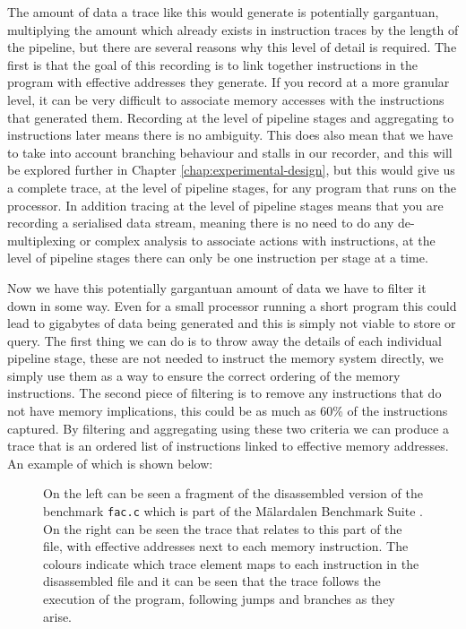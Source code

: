 The amount of data a trace like this would generate is potentially gargantuan, multiplying the amount which already exists in instruction traces by the length of the pipeline, but there are several reasons why this level of detail is required. The first is that the goal of this recording is to link together instructions in the program with effective addresses they generate. If you record at a more granular level, it can be very difficult to associate memory accesses with the instructions that generated them. Recording at the level of pipeline stages and aggregating to instructions later means there is no ambiguity. This does also mean that we have to take into account branching behaviour and stalls in our recorder, and this will be explored further in Chapter \ref{chap:experimental-design}, but this would give us a complete trace, at the level of pipeline stages, for any program that runs on the processor. In addition tracing at the level of pipeline stages means that you are recording a serialised data stream, meaning there is no need to do any de-multiplexing or complex analysis to associate actions with instructions, at the level of pipeline stages there can only be one instruction per stage at a time. 

Now we have this potentially gargantuan amount of data we have to filter it down in some way. Even for a small processor running a short program this could lead to gigabytes of data being generated and this is simply not viable to store or query. The first thing we can do is to throw away the details of each individual pipeline stage, these are not needed to instruct the memory system directly, we simply use them as a way to ensure the correct ordering of the memory instructions. The second piece of filtering is to remove any instructions that do not have memory implications, this could be as much as 60\% of the instructions captured. By filtering and aggregating using these two criteria we can produce a trace that is an ordered list of instructions linked to effective memory addresses. An example of which is shown below:

\begin{figure}
	
	\caption{On the left can be seen a fragment of the disassembled version of the benchmark \texttt{fac.c} which is part of the Mälardalen Benchmark Suite \cite{gustafssonMalardalenWCETBenchmarks2010}. On the right can be seen the trace that relates to this part of the file, with effective addresses next to each memory instruction. The colours indicate which trace element maps to each instruction in the disassembled file and it can be seen that the trace follows the execution of the program, following jumps and branches as they arise.}
\end{figure}


